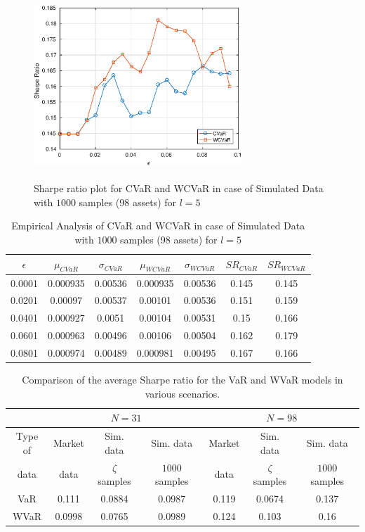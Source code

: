 \documentclass[12pt]{article}
\numberwithin{equation}{section}
\begin{document}
\begin{figure}[!h]
\centering
\includegraphics[height=7.0cm,width=0.7\textwidth]{CVaR/bse100_simulated/sr_1000_5.eps}
\caption{Sharpe ratio plot for CVaR and WCVaR in case of Simulated Data with $1000$ samples (98 assets) for $l=5$}
\label{fig:6.6}
\end{figure}

\begin{table}[!h]
\centering
\captionsetup{justification=centering}
\begin{tabular}{||c|c|c|c|c|c|c||}
\hline
$\epsilon$ & $\mu_{CVaR}$ & $\sigma_{CVaR}$ & $\mu_{WCVaR}$ & $\sigma_{WCVaR}$ & $SR_{CVaR}$ & $SR_{WCVaR}$\\
\hline
0.0001 & 0.000935 & 0.00536 & 0.000935 & 0.00536 & 0.145 & 0.145 \\
0.0201 & 0.00097 & 0.00537 & 0.00101 & 0.00536 & 0.151 & 0.159 \\
0.0401 & 0.000927 & 0.0051 & 0.00104 & 0.00531 & 0.15 & 0.166 \\
0.0601 & 0.000963 & 0.00496 & 0.00106 & 0.00504 & 0.162 & 0.179 \\
0.0801 & 0.000974 & 0.00489 & 0.000981 & 0.00495 & 0.167 & 0.166 \\
\hline
\end{tabular}
\caption{Empirical Analysis of CVaR and WCVaR in case of Simulated Data with $1000$ samples (98 assets) for $l=5$}
\label{tab:6.6}
\end{table}

\begin{table}[!h]
\centering
\small
\captionsetup{justification=centering}
\begin{tabular}{|c|c|c|c|c|c|c|}
\hline
\multirow{2}{*}{} $N$ &
\multicolumn{3}{c|}{$N=31$} &
\multicolumn{3}{c|}{$N=98$}  \\
\hline
Type of & Market & Sim. data & Sim. data & Market & Sim. data & Sim. data \\
data & data & $\zeta$ samples & $1000$ samples & data & $\zeta$ samples & $1000$ samples \\
\hline
VaR & 0.111 & 0.0884 & 0.0987 & 0.119 & 0.0674 & 0.137 \\
\hline
WVaR & 0.0998 & 0.0765 & 0.0989 & 0.124 & 0.103 & 0.16 \\
\hline
\end{tabular}
\caption{Comparison of the average Sharpe ratio for the VaR and WVaR models in various scenarios.}
\label{tab:var_conc}
\end{table}
\end{document}
